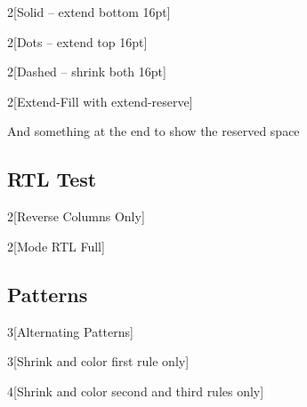 \documentclass{article}
\begin{document}
\begin{multicols}{2}[Solid -- extend bottom 16pt]
  \lipsum[1]
\end{multicols}

\begin{multicols}{2}[Dots -- extend top 16pt]
  \lipsum[1]
\end{multicols}

\begin{multicols}{2}[Dashed -- shrink both 16pt]
  \lipsum[1]
\end{multicols}

\begin{multicols}{2}[Extend-Fill with extend-reserve]
  \lipsum[1-5]
\end{multicols}
And something at the end to show the reserved space

\subsection*{RTL Test}

\RLmulticolcolumns

\begin{multicols}{2}[Reverse Columns Only]
  \lipsum[1-2]
\end{multicols}

\begin{RTL}
  \begin{multicols}{2}[Mode RTL Full]
    \lipsum[1-2]
  \end{multicols}
\end{RTL}

\subsection*{Patterns}

\begin{multicols}{3}[Alternating Patterns]
  \lipsum[1-3]
\end{multicols}

\begin{multicols}{3}[Shrink and color first rule only]
  \raggedcolumns
  \lipsum
\end{multicols}

\begin{multicols}{4}[Shrink and color second and third rules only]
  \raggedcolumns
  \lipsum
\end{multicols}
\end{document}
